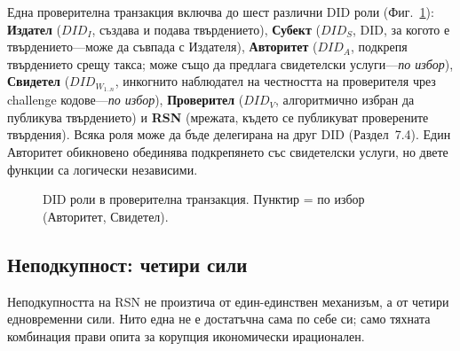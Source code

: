 \documentclass[11pt,a4paper,twocolumn]{article}
\begin{document}
Една проверителна транзакция включва до шест различни DID роли (Фиг.~\ref{fig:roles}): \textbf{Издател} ($DID_I$, създава и подава твърдението), \textbf{Субект} ($DID_S$, DID, за когото е твърдението---може да съвпада с Издателя), \textbf{Авторитет} ($DID_A$, подкрепя твърдението срещу такса; може също да предлага свидетелски услуги---\emph{по избор}), \textbf{Свидетел} ($DID_{W_{1..n}}$, инкогнито наблюдател на честността на проверителя чрез challenge кодове---\emph{по избор}), \textbf{Проверител} ($DID_V$, алгоритмично избран да публикува твърдението) и \textbf{RSN} (мрежата, където се публикуват проверените твърдения). Всяка роля може да бъде делегирана на друг DID (Раздел~7.4). Един Авторитет обикновено обединява подкрепянето със свидетелски услуги, но двете функции са логически независими.

\begin{figure}[ht]
\centering
{}
\caption{DID роли в проверителна транзакция. Пунктир = по избор (Авторитет, Свидетел).}
\label{fig:roles}
\end{figure}

\subsection{Неподкупност: четири сили}

Неподкупността на RSN не произтича от един-единствен механизъм, а от четири едновременни сили. Нито една не е достатъчна сама по себе си; само тяхната комбинация прави опита за корупция икономически ирационален.
\end{document}
